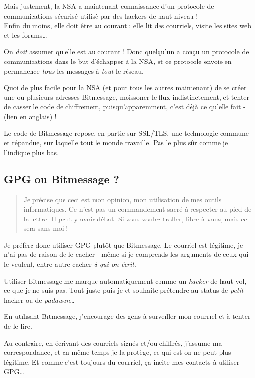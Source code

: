 Mais justement, la NSA a maintenant connaissance d'un protocole de
communications sécurisé utilisé par des hackers de haut-niveau !\\Enfin
du moins, elle doit être au courant : elle lit des courriels, visite les
sites web et les forums\ldots{}

On \emph{doit} assumer qu'elle est au courant ! Donc quelqu'un a conçu
un protocole de communications dans le but d'échapper à la NSA, et ce
protocole envoie en permanence \emph{tous} les messages à \emph{tout} le
réseau.

Quoi de plus facile pour la NSA (et pour tous les autres maintenant) de
se créer une ou plusieurs adresses Bitmessage, moissoner le flux
indistinctement, et tenter de casser le code de chiffrement,
puisqu'apparemment, c'est
\href{http://www.nytimes.com/2013/09/06/us/nsa-foils-much-internet-encryption.html}{déjà
ce qu'elle fait - (lien en anglais)} !

Le code de Bitmessage repose, en partie sur SSL/TLS, une technologie
commune et répandue, sur laquelle tout le monde travaille. Pas le plus
sûr comme je l'indique plus bas.

\subsection{GPG ou Bitmessage ?}\label{gpg-ou-bitmessage}

\begin{quotation}
Je précise que ceci est mon opinion, mon utilisation de mes outils
informatiques. Ce n'est pas un commandement sacré à respecter au pied de
la lettre. Il peut y avoir débat. Si vous voulez troller, libre à vous,
mais ce sera sans moi !
\end{quotation}

Je préfère donc utiliser GPG plutôt que Bitmessage. Le courriel est
légitime, je n'ai pas de raison de le cacher - même si je comprends les
arguments de ceux qui le veulent, entre autre cacher \emph{à qui on écrit}.

Utiliser Bitmessage me marque automatiquement comme un \emph{hacker} de
haut vol, ce que je ne suis pas. Tout juste puis-je et souhaite
prétendre au status de \emph{petit} hacker ou de \emph{padawan}\ldots{}

En utilisant Bitmessage, j'encourage des gens à surveiller mon courriel
et à tenter de le lire.

Au contraire, en écrivant des courriels signés et/ou chiffrés, j'assume
ma correspondance, et en même temps je la protège, ce qui est on ne peut
plus légitime. Et comme c'est toujours du courriel, ça incite mes
contacts à utiliser GPG\ldots{}

